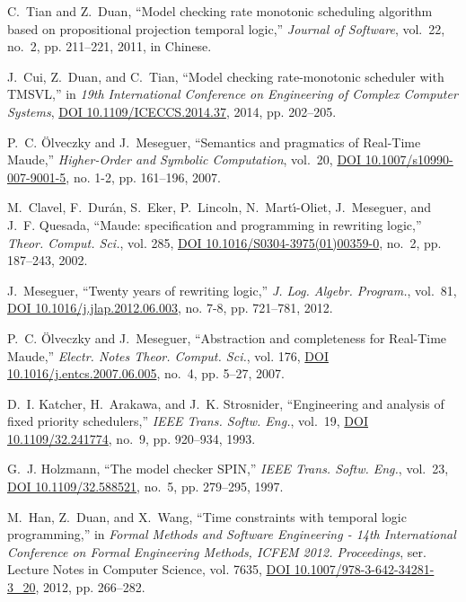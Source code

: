 \documentclass[12pt,onecolumn]{IEEEtranTIE}
\begin{document}
\begin{thebibliography}{10}
C.~Tian and Z.~Duan, ``Model checking rate monotonic scheduling algorithm based
  on propositional projection temporal logic,'' \emph{Journal of Software},
  vol.~22, no.~2, pp. 211--221, 2011, in {Chinese}.

J.~Cui, Z.~Duan, and C.~Tian, ``Model checking rate-monotonic scheduler with
  {TMSVL},'' in \emph{19th International Conference on Engineering of Complex
  Computer Systems}, \href{http://dx.doi.org/10.1109/ICECCS.2014.37}{DOI
  10.1109/ICECCS.2014.37}, 2014, pp. 202--205.

P.~C. {\"{O}}lveczky and J.~Meseguer, ``Semantics and pragmatics of {Real-Time
  Maude},'' \emph{Higher-Order and Symbolic Computation}, vol.~20,
  \href{http://dx.doi.org/10.1007/s10990-007-9001-5}{DOI
  10.1007/s10990-007-9001-5}, no. 1-2, pp. 161--196, 2007.

M.~Clavel, F.~Dur{\'{a}}n, S.~Eker, P.~Lincoln, N.~Mart{\'{\i}}{-}Oliet,
  J.~Meseguer, and J.~F. Quesada, ``Maude: specification and programming in
  rewriting logic,'' \emph{Theor. Comput. Sci.}, vol. 285,
  \href{http://dx.doi.org/10.1016/S0304-3975(01)00359-0}{DOI
  10.1016/S0304-3975(01)00359-0}, no.~2, pp. 187--243, 2002.

J.~Meseguer, ``Twenty years of rewriting logic,'' \emph{J. Log. Algebr.
  Program.}, vol.~81, \href{http://dx.doi.org/10.1016/j.jlap.2012.06.003}{DOI
  10.1016/j.jlap.2012.06.003}, no. 7-8, pp. 721--781, 2012.

P.~C. {\"{O}}lveczky and J.~Meseguer, ``Abstraction and completeness for
  {Real-Time Maude},'' \emph{Electr. Notes Theor. Comput. Sci.}, vol. 176,
  \href{http://dx.doi.org/10.1016/j.entcs.2007.06.005}{DOI
  10.1016/j.entcs.2007.06.005}, no.~4, pp. 5--27, 2007.

D.~I. Katcher, H.~Arakawa, and J.~K. Strosnider, ``Engineering and analysis of
  fixed priority schedulers,'' \emph{{IEEE} Trans. Softw. Eng.}, vol.~19,
  \href{http://dx.doi.org/10.1109/32.241774}{DOI 10.1109/32.241774}, no.~9, pp.
  920--934, 1993.

G.~J. Holzmann, ``The model checker {SPIN},'' \emph{{IEEE} Trans. Softw. Eng.},
  vol.~23, \href{http://dx.doi.org/10.1109/32.588521}{DOI 10.1109/32.588521},
  no.~5, pp. 279--295, 1997.

M.~Han, Z.~Duan, and X.~Wang, ``Time constraints with temporal logic
  programming,'' in \emph{Formal Methods and Software Engineering - 14th
  International Conference on Formal Engineering Methods, {ICFEM} 2012.
  Proceedings}, ser. Lecture Notes in Computer Science, vol. 7635,
  \href{http://dx.doi.org/10.1007/978-3-642-34281-3\_20}{DOI
  10.1007/978-3-642-34281-3\_20}, 2012, pp. 266--282.

\end{thebibliography}\
\end{document}
